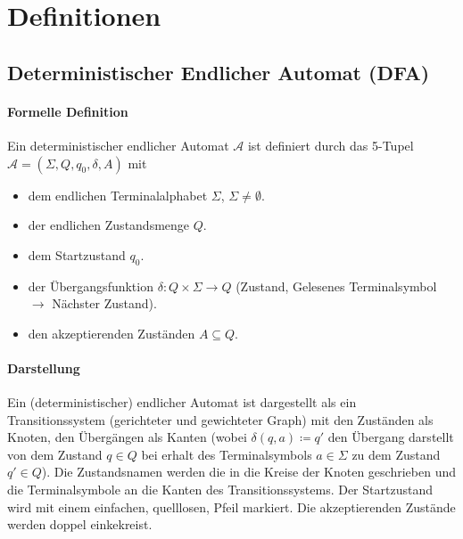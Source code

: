 \section{Definitionen}
    \subsection{Deterministischer Endlicher Automat (DFA)}
        \paragraph{Formelle Definition}
            Ein deterministischer endlicher Automat $ \mathcal{A} $ ist definiert durch das 5-Tupel $ \mathcal{A} = (\Sigma, Q, q _ 0, \delta, A) $ mit
            \begin{itemize}
                \item dem endlichen Terminalalphabet $ \Sigma $, $ \Sigma \neq \emptyset $.
                \item der endlichen Zustandsmenge $ Q $.
                \item dem Startzustand $ q _ 0 $.
                \item der Übergangsfunktion $ \delta : Q \times \Sigma \rightarrow Q $ (Zustand, Gelesenes Terminalsymbol $ \rightarrow $ Nächster Zustand).
                \item den akzeptierenden Zuständen $ A \subseteq Q $.
            \end{itemize}

        \paragraph{Darstellung}
            \label{dfa:darstellung}
            Ein (deterministischer) endlicher Automat ist dargestellt als ein Transitionssystem (gerichteter und gewichteter Graph) mit den Zuständen als Knoten, den Übergängen als Kanten (wobei $ \delta(q, a) \coloneqq q' $ den Übergang darstellt von dem Zustand $ q \in Q $ bei erhalt des Terminalsymbols $ a \in \Sigma $ zu dem Zustand $ q' \in Q $). Die Zustandsnamen werden die in die Kreise der Knoten geschrieben und die Terminalsymbole an die Kanten des Transitionssystems. Der Startzustand wird mit einem einfachen, quelllosen, Pfeil markiert. Die akzeptierenden Zustände werden doppel einkekreist.

